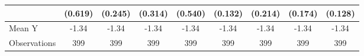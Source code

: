 {\begin{tabular}{l*{8}{c}}
            &     (0.619)         &     (0.245)         &     (0.314)         &     (0.540)         &     (0.132)         &     (0.214)         &     (0.174)         &     (0.128)         \\
\midrule
Mean Y      &       -1.34         &       -1.34         &       -1.34         &       -1.34         &       -1.34         &       -1.34         &       -1.34         &       -1.34         \\
Observations&         399         &         399         &         399         &         399         &         399         &         399         &         399         &         399         \\
\bottomrule
\end{tabular}
}

